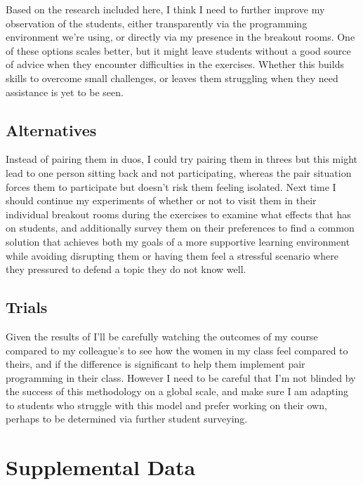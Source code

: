 \documentclass[paper=a4,justified,a4paper]{tufte-handout}
\begin{document}
Based on the research included here, I think I need to further improve
my observation of the students, either transparently via the programming
environment we're using, or directly via my presence in the breakout
rooms. One of these options scales better, but it might leave students
without a good source of advice when they encounter difficulties in the
exercises. Whether this builds skills to overcome small challenges, or
leaves them struggling when they need assistance is yet to be seen.

\hypertarget{alternatives}{%
\subsection{Alternatives}\label{alternatives}}

Instead of pairing them in duos, I could try pairing them in threes but
this might lead to one person sitting back and not participating,
whereas the pair situation forces them to participate but doesn't risk
them feeling isolated. Next time I should continue my experiments of
whether or not to visit them in their individual breakout rooms during
the exercises to examine what effects that has on students, and
additionally survey them on their preferences to find a common solution
that achieves both my goals of a more supportive learning environment
while avoiding disrupting them or having them feel a stressful scenario
where they pressured to defend a topic they do not know well.

\hypertarget{trials}{%
\subsection{Trials}\label{trials}}

Given the results of \citet{werner2004pair} I'll be carefully watching
the outcomes of my course compared to my colleague's to see how the
women in my class feel compared to theirs, and if the difference is
significant to help them implement pair programming in their class.
However I need to be careful that I'm not blinded by the success of this
methodology on a global scale, and make sure I am adapting to students
who struggle with this model and prefer working on their own, perhaps to
be determined via further student surveying.

\hypertarget{supplemental-data}{%
\section{Supplemental Data}\label{supplemental-data}}
\end{document}
